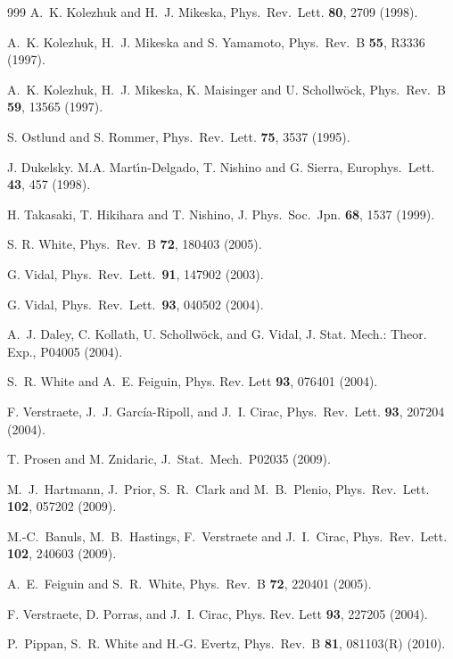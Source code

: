 \documentclass[a4paper,10pt,oneside,onecolumn,1p,times]{elsarticle}
\begin{document}
\begin{thebibliography}{999}
A.~K. Kolezhuk and H.~J. Mikeska, Phys.\ Rev.\ Lett. {\bf 80}, 2709 (1998).

A.~K. Kolezhuk, H.~J. Mikeska and S. Yamamoto, Phys.\ Rev.\ B {\bf 55}, R3336 (1997).

A.~K. Kolezhuk, H.~J. Mikeska, K. Maisinger and U. Schollw\"{o}ck, Phys.\ Rev.\ B {\bf 59}, 13565 (1997).

S. Ostlund and S. Rommer, Phys.\ Rev.\ Lett. {\bf 75}, 3537 (1995).

J. Dukelsky. M.A. Mart\'{\i}n-Delgado, T. Nishino and G. Sierra, Europhys.\ Lett. {\bf 43}, 457 (1998).

H. Takasaki, T. Hikihara and T. Nishino, J. Phys.\ Soc.\ Jpn. {\bf 68}, 1537 (1999).

S. R. White, Phys.\ Rev.\ B {\bf 72}, 180403 (2005).

G. Vidal, Phys.\ Rev.\ Lett.\ {\bf 91}, 147902 (2003).

G. Vidal, Phys.\ Rev.\ Lett.\ {\bf 93}, 040502  (2004).

A.~J. Daley, C. Kollath, U. Schollw{\"o}ck, and G. Vidal, J. Stat. Mech.: 
Theor. Exp.,  P04005  (2004).

S.~R. White and A.~E. Feiguin, Phys. Rev. Lett {\bf 93},  076401  (2004).

F. Verstraete, J.~J. Garc{\'i}a-Ripoll, and J.~I. Cirac, Phys.\ Rev.\ Lett. {\bf
  93},  207204  (2004).

T. Prosen and M. Znidaric, J.\ Stat.\ Mech.\ P02035 (2009).

M.~J.~Hartmann, J.~Prior, S.~R.~Clark and M.~B.~Plenio, 
Phys.\ Rev.\ Lett. {\bf 102}, 057202 (2009).

M.-C.~Banuls, M.~B.~Hastings, F.~Verstraete and J.~I.~Cirac, 
Phys.\ Rev.\ Lett. {\bf 102}, 240603 (2009).

A.~E.~Feiguin and S.~R.~White, 
Phys.\ Rev.\ B {\bf 72}, 220401 (2005).

F. Verstraete, D. Porras, and J.~I. Cirac, Phys. Rev. Lett {\bf 93},  227205
  (2004).

P.~Pippan, S.~R. White and H.-G. Evertz, Phys.\ Rev.\ B {\bf 81}, 081103(R) (2010).


\end{thebibliography}
\end{document}
